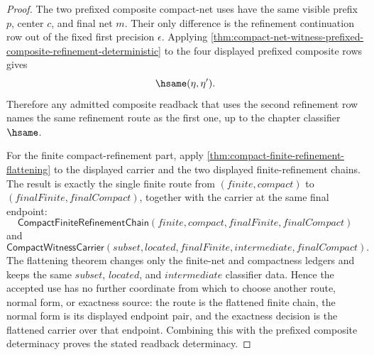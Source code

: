 \begin{proof}
The two prefixed composite compact-net uses have the same visible prefix
$p$, center $c$, and final net $m$. Their only difference is the refinement
continuation row out of the fixed first precision $\epsilon$. Applying
\autoref{thm:compact-net-witness-prefixed-composite-refinement-deterministic}
to the four displayed prefixed composite rows gives
$$
\hsame(\eta,\eta').
$$
Therefore any admitted composite readback that uses the second refinement row
names the same refinement route as the first one, up to the chapter classifier
$\hsame$.

For the finite compact-refinement part, apply
\autoref{thm:compact-finite-refinement-flattening} to the displayed carrier and
the two displayed finite-refinement chains. The result is exactly the single
finite route from $(finite,compact)$ to $(finalFinite,finalCompact)$, together
with the carrier at the same final endpoint:
$$
\mathsf{CompactFiniteRefinementChain}(finite,compact,finalFinite,finalCompact)
$$
and
$$
\mathsf{CompactWitnessCarrier}(subset,located,finalFinite,intermediate,finalCompact).
$$
The flattening theorem changes only the finite-net and compactness ledgers and
keeps the same $subset$, $located$, and $intermediate$ classifier data. Hence
the accepted use has no further coordinate from which to choose another route,
normal form, or exactness source: the route is the flattened finite chain, the
normal form is its displayed endpoint pair, and the exactness decision is the
flattened carrier over that endpoint. Combining this with the prefixed
composite determinacy proves the stated readback determinacy.
\end{proof}
